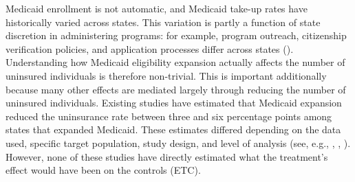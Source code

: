\documentclass[aoas]{imsart}
\theoremstyle{plain}
\theoremstyle{remark}
\begin{document}
Medicaid enrollment is not automatic, and Medicaid take-up rates have historically varied across states. This variation is partly a function of state discretion in administering programs: for example, program outreach, citizenship verification policies, and application processes differ across states (\cite{courtemanche2017early}). Understanding how Medicaid eligibility expansion actually affects the number of uninsured individuals is therefore non-trivial. This is important additionally because many other effects are mediated largely through reducing the number of uninsured individuals. Existing studies have estimated that Medicaid expansion reduced the uninsurance rate between three and six percentage points among states that expanded Medicaid. These estimates differed depending on the data used, specific target population, study design, and level of analysis (see, e.g., \cite{kaestner2017effects}, \cite{courtemanche2017early}, \cite{frean2017premium}). However, none of these studies have directly estimated what the treatment's effect would have been on the controls (ETC). 
\end{document}
